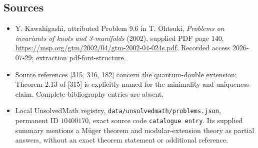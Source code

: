 \documentclass[11pt]{article}
\begin{document}
\subsection{Sources}
\begin{itemize}
\item Y. Kawahigashi, attributed Problem 9.6 in T. Ohtsuki, \emph{Problems on invariants of knots and 3-manifolds} (2002), supplied PDF page 140. \url{https://msp.org/gtm/2002/04/gtm-2002-04-024s.pdf}. Recorded access 2026-07-29; extraction pdf-font-structure.
\item Source references [315, 316, 182] concern the quantum-double extension; Theorem 2.13 of [315] is explicitly named for the minimality and uniqueness claim. Complete bibliography entries are absent.
\item Local UnsolvedMath registry, \texttt{data/unsolvedmath/problems.json}, permanent ID \(10400170\), exact source code \texttt{catalogue entry}. Its supplied summary mentions a M\"uger theorem and modular-extension theory as partial answers, without an exact theorem statement or additional reference.
\end{itemize}
\end{document}
